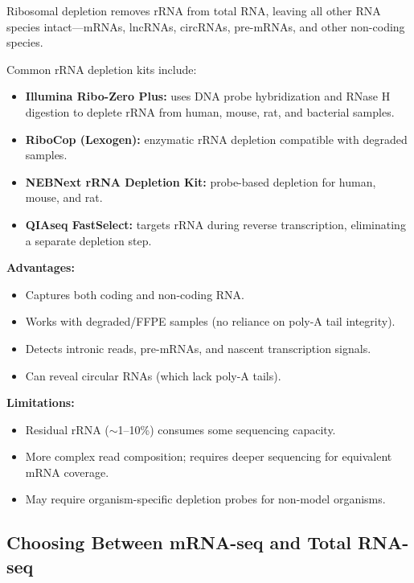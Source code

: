 Ribosomal depletion removes rRNA from total RNA, leaving all other RNA species
intact---mRNAs, lncRNAs, circRNAs, pre-mRNAs, and other non-coding species.

Common rRNA depletion kits include:
\begin{itemize}[nosep]
  \item \textbf{Illumina Ribo-Zero Plus:} uses DNA probe hybridization and
    RNase H digestion to deplete rRNA from human, mouse, rat, and bacterial
    samples.
  \item \textbf{RiboCop (Lexogen):} enzymatic rRNA depletion compatible with
    degraded samples.
  \item \textbf{NEBNext rRNA Depletion Kit:} probe-based depletion for human,
    mouse, and rat.
  \item \textbf{QIAseq FastSelect:} targets rRNA during reverse transcription,
    eliminating a separate depletion step.
\end{itemize}

\textbf{Advantages:}
\begin{itemize}[nosep]
  \item Captures both coding and non-coding RNA.
  \item Works with degraded/FFPE samples (no reliance on poly-A tail integrity).
  \item Detects intronic reads, pre-mRNAs, and nascent transcription signals.
  \item Can reveal circular RNAs (which lack poly-A tails).
\end{itemize}

\textbf{Limitations:}
\begin{itemize}[nosep]
  \item Residual rRNA ($\sim$1--10\%) consumes some sequencing capacity.
  \item More complex read composition; requires deeper sequencing for equivalent
    mRNA coverage.
  \item May require organism-specific depletion probes for non-model organisms.
\end{itemize}

\subsection{Choosing Between mRNA-seq and Total RNA-seq}

